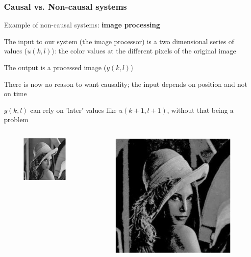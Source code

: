 \documentclass{beamer}
\begin{document}
	\begin{frame}
		\frametitle{Causal vs. Non-causal systems}
		Example of non-causal systems: \textbf{image processing}\\
		\begin{itemize}
			\small{
				\item The input to our system (the image processor) is a two dimensional series of values ($u(k,l)$): the color values at the different pixels of the original image
				\item The output is a processed image ($y(k,l)$)
				\item There is now no reason to want causality; the input depends on position and not on time
				\item $y(k,l)$ can rely on 'later' values like $u(k+1,l+1)$, without that being a problem}
		\end{itemize}
		\vspace{-2ex}
		\begin{columns}
			\begin{figure}
				\includegraphics[width=.5\linewidth]{original}
			\end{figure}
			\vspace{-4ex}
			
			\begin{figure}
				\includegraphics[width=.5\linewidth]{removed}
			\end{figure}
			\vspace{-4ex}
			

\end{columns}
\end{frame}
\end{document}
